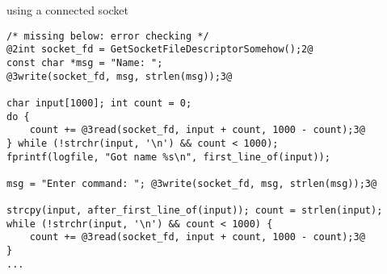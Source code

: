 \begin{frame}[fragile]{using a connected socket}
\begin{lstlisting}
/* missing below: error checking */
@2int socket_fd = GetSocketFileDescriptorSomehow();2@
const char *msg = "Name: ";
@3write(socket_fd, msg, strlen(msg));3@

char input[1000]; int count = 0;
do {
    count += @3read(socket_fd, input + count, 1000 - count);3@
} while (!strchr(input, '\n') && count < 1000);
fprintf(logfile, "Got name %s\n", first_line_of(input));

msg = "Enter command: "; @3write(socket_fd, msg, strlen(msg));3@

strcpy(input, after_first_line_of(input)); count = strlen(input);
while (!strchr(input, '\n') && count < 1000) {
    count += @3read(socket_fd, input + count, 1000 - count);3@
} 
...
\end{lstlisting}
\end{frame}
